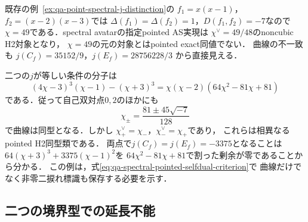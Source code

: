 \begin{example}
\label{ex:qa-spectral-avatar-pointed-inequivalent}
既存の例~\ref{ex:qa-point-spectral-j-distinction}の
$f_1=x(x-1)$，$f_2=(x-2)(x-3)$では
$\Delta(f_1)=\Delta(f_2)=1$，$D(f_1,f_2)=-7$なので
$\chi=49$である．spectral avatarの指定pointed AS実現は
$\chi^\vee=49/48$のnoncubic H2対象となり，
$\chi=49$の元の対象とはpointed exact同値でない．
曲線の不一致も
$j(C_f)=35152/9$，$j(E_f)=28756228/3$
から直接見える．
\end{example}

\begin{example}[曲線が同型でもpointed対象は異なり得る]
\label{ex:qa-spectral-equal-j-not-pointed}
二つの$j$が等しい条件の分子は
\[
(4\chi-3)^3(\chi-1)-(\chi+3)^3
=\chi(\chi-2)(64\chi^2-81\chi+81)
\]
である．従って自己双対点$0,2$のほかにも
\[
\chi_\pm=\frac{81\pm45\sqrt{-7}}{128}
\]
で曲線は同型となる．しかし
$\chi_+^\vee=\chi_-$，$\chi_-^\vee=\chi_+$であり，
これらは相異なるpointed H2同型類である．
両点で$j(C_f)=j(E_f)=-3375$となることは
$64(\chi+3)^3+3375(\chi-1)^2$を
$64\chi^2-81\chi+81$で割った剰余が零であることから分かる．
この例は，式\eqref{eq:qa-spectral-pointed-selfdual-criterion}で
曲線だけでなく非零二捩れ標識も保存する必要を示す．
\end{example}

\subsection{二つの境界型での延長不能}

